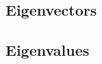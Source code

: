\subsection{Eigenvectors}\label{subsec:Eigenvectors}

\subsection{Eigenvalues}\label{subsec:Eigenvalues}

